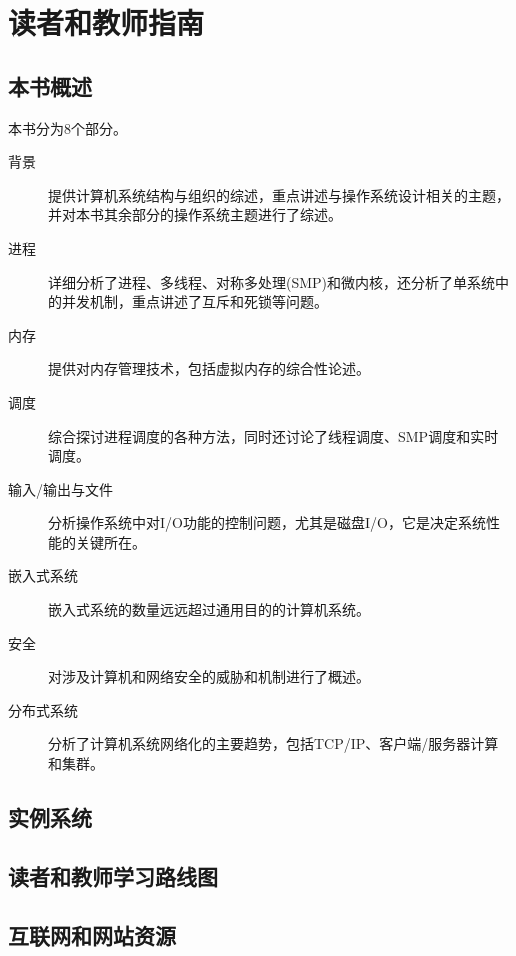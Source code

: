 
\chapter{读者和教师指南}
{
    \section{本书概述}
    {
        本书分为8个部分。

        \begin{description}
            \item[背景] 提供计算机系统结构与组织的综述，重点讲述与操作系统设计相关的主题，并对本书其余部分的操作系统主题进行了综述。
            \item[进程] 详细分析了进程、多线程、对称多处理(SMP)和微内核，还分析了单系统中的并发机制，重点讲述了互斥和死锁等问题。
            \item[内存] 提供对内存管理技术，包括虚拟内存的综合性论述。
            \item[调度] 综合探讨进程调度的各种方法，同时还讨论了线程调度、SMP调度和实时调度。
            \item[输入/输出与文件] 分析操作系统中对I/O功能的控制问题，尤其是磁盘I/O，它是决定系统性能的关键所在。
            \item[嵌入式系统]嵌入式系统的数量远远超过通用目的的计算机系统。
            \item[安全] 对涉及计算机和网络安全的威胁和机制进行了概述。
            \item[分布式系统] 分析了计算机系统网络化的主要趋势，包括TCP/IP、客户端/服务器计算和集群。
        \end{description}
    }

    \section{实例系统}
    {

    }

    \section{读者和教师学习路线图}
    {

    }

    \section{互联网和网站资源}
    {

    }
}

\cleardoublepage

\endinput
